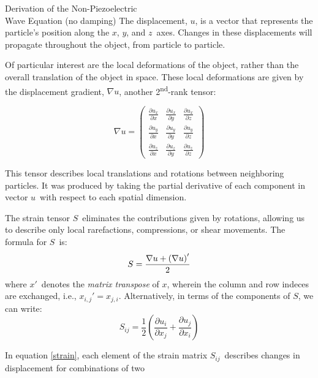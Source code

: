 \documentclass[a4paper,10pt]{report}
\numberwithin{equation}{section}
\begin{document}
{\begin{chapter}
\begin{section}{Derivation of the Non-Piezoelectric \\Wave Equation (no damping)}
The displacement, $u$, is a vector that represents the particle's position along
the $x$, $y$, and $z$\  axes. Changes in these displacements will propagate throughout the object, from particle to particle. \cite{Ballantine1997, Kino1987}
\par
Of particular interest are the local deformations of the object, rather than the
overall translation of the object in space. These local deformations are given by the displacement gradient, $\nabla u$, another 2\textsuperscript{nd}-rank tensor\cite[p.~12]{Ballantine1997}:
\begin{singlespace}
\begin{equation*}
\nabla u = \begin{pmatrix}
         \frac{\partial u_x}{\partial x} & \frac{\partial u_x}{\partial y} &
\frac{\partial u_x}{\partial z} \\[0.5em]
         \frac{\partial u_y}{\partial x} & \frac{\partial u_y}{\partial y} &
\frac{\partial u_y}{\partial z} \\[0.5em]
         \frac{\partial u_z}{\partial x} & \frac{\partial u_z}{\partial y} &
\frac{\partial u_z}{\partial z}
        \end{pmatrix}
\end{equation*}
\end{singlespace}
This tensor describes local translations and rotations between neighboring
particles. It was produced by taking the partial derivative of each component in vector $u$\  with respect to each spatial dimension.
\par
The strain tensor $S$\  eliminates the contributions given by rotations, allowing us to describe only local rarefactions, compressions, or shear movements. The formula for $S$\  is:
\begin{equation*}
S = \frac{\nabla u + \left(\nabla u \right)'}{2} \notag \\
\end{equation*}
where $x'$\  denotes the \emph{matrix transpose} of $x$, wherein the column and row indeces are exchanged, i.e., $x_{i,j}' = x_{j,i}$. \footnotemark Alternatively, in terms of the components of $S$, we can write\cite[p.~13]{Ballantine1997}:
\begin{equation}
S_{ij} = \frac{1}{2}\left(\frac{\partial u_i}{\partial x_j} + \frac{\partial
u_j}{\partial x_i}\right)
\end{equation}
\footnotemark 
\par
In equation \eqref{strain}, each element of the strain matrix $S_{ij}$\  describes
changes in displacement for combinations of two 

\end{section}
\end{chapter}}
\end{document}

